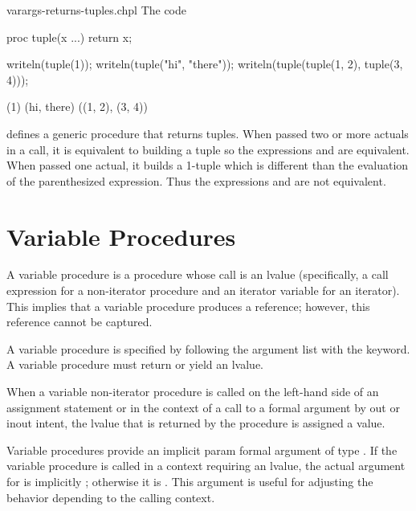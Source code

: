 \begin{chapelexample}{varargs-returns-tuples.chpl}
The code
\begin{chapel}
proc tuple(x ...) return x;
\end{chapel}
\begin{chapelpost}
writeln(tuple(1));
writeln(tuple("hi", "there"));
writeln(tuple(tuple(1, 2), tuple(3, 4)));
\end{chapelpost}
\begin{chapeloutput}
(1)
(hi, there)
((1, 2), (3, 4))
\end{chapeloutput}
defines a generic procedure that returns tuples.  When passed two or
more actuals in a call, it is equivalent to building a tuple so the
expressions  and  are equivalent.  When
passed one actual, it builds a 1-tuple which is different than the
evaluation of the parenthesized expression.  Thus the
expressions  and  are not equivalent.
\end{chapelexample}


\section{Variable Procedures}
\label{Variable_Procedures}

A variable procedure is a procedure whose call is an lvalue
(specifically, a call expression for a non-iterator procedure and
an iterator variable for an iterator).
This implies that a variable procedure produces a reference;
however, this
reference cannot be captured.

A variable procedure is specified by following the argument list with
the  keyword.  A variable procedure must return or yield an lvalue.

When a variable non-iterator procedure is called on the left-hand side of an
assignment statement or in the context of a call to a formal argument
by out or inout intent, the lvalue that is returned by the procedure is
assigned a value.

Variable procedures provide an implicit param formal argument 
of type .  If the
variable procedure is called in a context requiring an lvalue,
the actual argument for  is implicitly ;
otherwise it is .  This argument is useful for adjusting
the behavior depending to the calling context.


